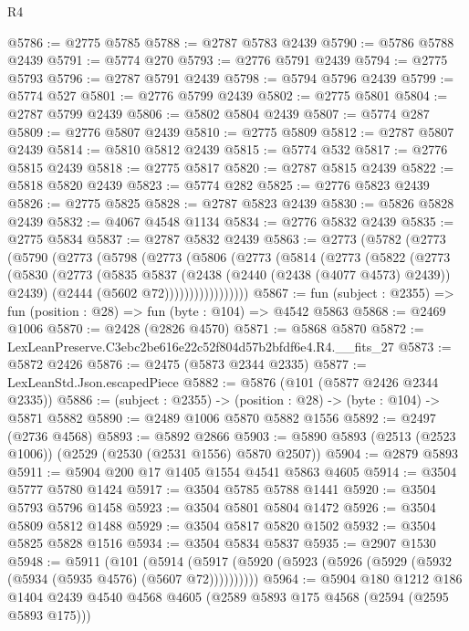 \begin{lexlean}{R4}
\begin{coremodule}
@5786 := @2775 @5785
@5788 := @2787 @5783 @2439
@5790 := @5786 @5788 @2439
@5791 := @5774 @270
@5793 := @2776 @5791 @2439
@5794 := @2775 @5793
@5796 := @2787 @5791 @2439
@5798 := @5794 @5796 @2439
@5799 := @5774 @527
@5801 := @2776 @5799 @2439
@5802 := @2775 @5801
@5804 := @2787 @5799 @2439
@5806 := @5802 @5804 @2439
@5807 := @5774 @287
@5809 := @2776 @5807 @2439
@5810 := @2775 @5809
@5812 := @2787 @5807 @2439
@5814 := @5810 @5812 @2439
@5815 := @5774 @532
@5817 := @2776 @5815 @2439
@5818 := @2775 @5817
@5820 := @2787 @5815 @2439
@5822 := @5818 @5820 @2439
@5823 := @5774 @282
@5825 := @2776 @5823 @2439
@5826 := @2775 @5825
@5828 := @2787 @5823 @2439
@5830 := @5826 @5828 @2439
@5832 := @4067 @4548 @1134
@5834 := @2776 @5832 @2439
@5835 := @2775 @5834
@5837 := @2787 @5832 @2439
@5863 := @2773
    (@5782
      (@2773
        (@5790
          (@2773
            (@5798
              (@2773
                (@5806
                  (@2773
                    (@5814
                      (@2773
                        (@5822
                          (@2773
                            (@5830
                              (@2773
                                (@5835
                                  @5837
                                  (@2438 (@2440 (@2438 (@4077 @4573) @2439)) @2439)
                                  (@2444 (@5602 @72)))))))))))))))))
@5867 := fun (subject : @2355) => fun (position : @28) => fun (byte : @104) => @4542 @5863
@5868 := @2469 @1006
@5870 := @2428 (@2826 @4570)
@5871 := @5868 @5870
@5872 := LexLeanPreserve.C3ebc2be616e22c52f804d57b2bfdf6e4.R4.__fits_27
@5873 := @5872 @2426
@5876 := @2475 (@5873 @2344 @2335)
@5877 := LexLeanStd.Json.escapedPiece
@5882 := @5876 (@101 (@5877 @2426 @2344 @2335))
@5886 := (subject : @2355) -> (position : @28) -> (byte : @104) -> @5871 @5882
@5890 := @2489 @1006 @5870 @5882 @1556
@5892 := @2497 (@2736 @4568)
@5893 := @5892 @2866
@5903 := @5890 @5893 (@2513 (@2523 @1006)) (@2529 (@2530 (@2531 @1556) @5870 @2507))
@5904 := @2879 @5893
@5911 := @5904 @200 @17 @1405 @1554 @4541 @5863 @4605
@5914 := @3504 @5777 @5780 @1424
@5917 := @3504 @5785 @5788 @1441
@5920 := @3504 @5793 @5796 @1458
@5923 := @3504 @5801 @5804 @1472
@5926 := @3504 @5809 @5812 @1488
@5929 := @3504 @5817 @5820 @1502
@5932 := @3504 @5825 @5828 @1516
@5934 := @3504 @5834 @5837
@5935 := @2907 @1530
@5948 := @5911
    (@101 (@5914 (@5917 (@5920 (@5923 (@5926 (@5929 (@5932 (@5934 (@5935 @4576) (@5607 @72))))))))))
@5964 := @5904
    @180
    @1212
    @186
    @1404
    @2439
    @4540
    @4568
    @4605
    (@2589 @5893 @175 @4568 (@2594 (@2595 @5893 @175)))

\end{coremodule}
\end{lexlean}
